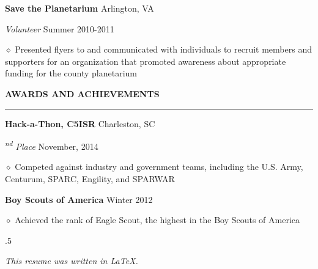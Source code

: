 \documentclass[executivepaper]{extarticle}
\begin{document}
\begin{center}
{\begin{minipage}{7.0in}
{\noindent \textbf{\fontsize{9}{8}\selectfont Save the Planetarium}} {\hfill \fontsize{9}{8}\selectfont Arlington, VA}

{\noindent \textit{\fontsize{9}{8}\selectfont Volunteer}} {\hfill \fontsize{9}{8}\selectfont Summer 2010-2011}

{\noindent $\diamond$ {\fontsize{9}{8}\selectfont Presented flyers to and communicated with individuals to recruit members and supporters for an organization that promoted awareness about appropriate funding
for the county planetarium}}

\vspace{3mm}


{\noindent \textbf{\fontsize{10}{9}\selectfont AWARDS AND ACHIEVEMENTS}}

\vspace{-3mm}

\noindent \rule{\textwidth}{0.5pt}

\vspace{-1mm}

{\noindent \textbf{\fontsize{9}{8}\selectfont Hack-a-Thon, C5ISR}} {\hfill \fontsize{9}{8}\selectfont Charleston, SC}

{\noindent \textit{\fontsize{9}{8}\textsuperscript{nd} Place}} {\hfill \fontsize{9}{8}\selectfont November, 2014}

{\noindent $\diamond$ {\fontsize{9}{8}\selectfont Competed against industry and government teams, including the U.S. Army, Centurum, SPARC, Engility, and SPARWAR}}

{\noindent \textbf{\fontsize{9}{8}\selectfont Boy Scouts of America}} {\hfill \fontsize{9}{8}\selectfont Winter 2012}

{\noindent $\diamond$ {\fontsize{9}{8}\selectfont Achieved the rank of Eagle Scout, the highest in the Boy Scouts of America}}

\vspace{5mm}



\moveleft.5\hoffset\centerline{{\small\sl This resume was written in \LaTeX.}}

\end{minipage}

}

\end{center}
\end{document}
